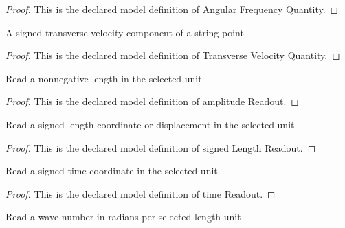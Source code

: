\begin{proof}
  This is the declared model definition of Angular Frequency Quantity.
\end{proof}
\begin{definition}
  \label{def:physics:phyx-mini-0300:phyxminiproblems-problemphyxmini0300-transversevelocityquantity}
  A signed transverse-velocity component of a string point
\end{definition}
\begin{proof}
  This is the declared model definition of Transverse Velocity Quantity.
\end{proof}
\begin{definition}
  \label{def:physics:phyx-mini-0300:phyxminiproblems-problemphyxmini0300-amplitudereadout}
  Read a nonnegative length in the selected unit
\end{definition}
\begin{proof}
  This is the declared model definition of amplitude Readout.
\end{proof}
\begin{definition}
  \label{def:physics:phyx-mini-0300:phyxminiproblems-problemphyxmini0300-signedlengthreadout}
  Read a signed length coordinate or displacement in the selected unit
\end{definition}
\begin{proof}
  This is the declared model definition of signed Length Readout.
\end{proof}
\begin{definition}
  \label{def:physics:phyx-mini-0300:phyxminiproblems-problemphyxmini0300-timereadout}
  Read a signed time coordinate in the selected unit
\end{definition}
\begin{proof}
  This is the declared model definition of time Readout.
\end{proof}
\begin{definition}
  \label{def:physics:phyx-mini-0300:phyxminiproblems-problemphyxmini0300-wavenumberreadout}
  Read a wave number in radians per selected length unit
\end{definition}

